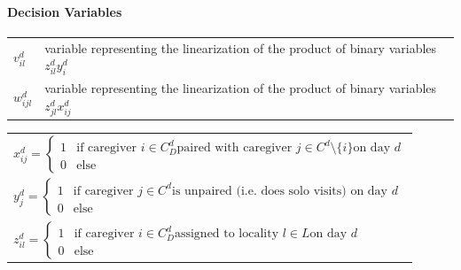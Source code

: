 \documentclass[11pt,twoside]{article}
\numberwithin{Theorem}{section}
\numberwithin{Definition}{section}
\numberwithin{Lemma}{section}
\numberwithin{Algorithm}{section}
\numberwithin{equation}{section}
\newenvironment{modelvars}{
\paragraph{Decision Variables}\mbox{}
\begin{table}[H]
\begin{tabular}{ll}
}{
\end{tabular}
\end{table}
}
\begin{document}
\begin{modelvars}
	$v_{il}^d$ & \quad variable representing the linearization of the product of binary variables $z_{il}^d y_{i}^d$\\
	$w_{ijl}^d$ & \quad variable representing the linearization of the product of binary variables $z_{jl}^d x_{ij}^d$
\end{modelvars}
\begin{table}[H]
	\begin{tabular}{l}
		$x_{ij}^d = 
			\begin{cases}
				1 & \text{if caregiver } i \in C_D^d \text{paired with caregiver } j \in C^d \setminus \{i\} \text{on day } d\\
				0 & \text{else}
			\end{cases}
		$ \\
		$y_{j}^d =
			\begin{cases}
				1 & \text{if caregiver } j \in C^d \text{is unpaired (i.e. does solo visits) on day } d\\
				0 & \text{else}
			\end{cases}
		$ \\
		$z_{il}^d = 
			\begin{cases}
				1 & \text{if caregiver } i \in C_D^d \text{assigned to locality } l \in L \text{on day } d\\
				0 & \text{else}
			\end{cases}
		$
	\end{tabular}
\end{table}
\end{document}

